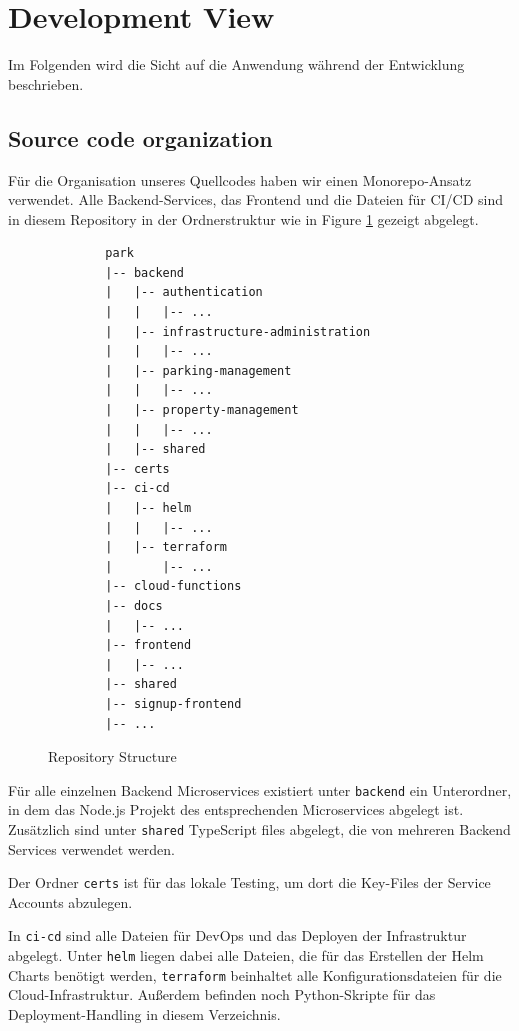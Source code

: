 \section{Development View}

Im Folgenden wird die Sicht auf die Anwendung während der Entwicklung beschrieben.

\subsection{Source code organization}
Für die Organisation unseres Quellcodes haben wir einen Monorepo-Ansatz verwendet. Alle Backend-Services, das Frontend und die Dateien für CI/CD sind in diesem Repository in der Ordnerstruktur wie in Figure \ref{fig:repo-structure} gezeigt abgelegt.

\begin{figure}[ht]
    \begin{verbatim}
        park
        |-- backend
        |   |-- authentication
        |   |   |-- ...
        |   |-- infrastructure-administration
        |   |   |-- ...
        |   |-- parking-management
        |   |   |-- ...
        |   |-- property-management
        |   |   |-- ...
        |   |-- shared
        |-- certs
        |-- ci-cd
        |   |-- helm
        |   |   |-- ...
        |   |-- terraform
        |       |-- ...
        |-- cloud-functions
        |-- docs
        |   |-- ...
        |-- frontend
        |   |-- ...
        |-- shared
        |-- signup-frontend
        |-- ...
    \end{verbatim}
    \caption{Repository Structure}
    \label{fig:repo-structure}
\end{figure}

Für alle einzelnen Backend Microservices existiert unter \verb|backend| ein Unterordner, in dem das Node.js Projekt des entsprechenden Microservices abgelegt ist. Zusätzlich sind unter \verb|shared| TypeScript files abgelegt, die von mehreren Backend Services verwendet werden.

Der Ordner \verb|certs| ist für das lokale Testing, um dort die Key-Files der Service Accounts abzulegen.

In \verb|ci-cd| sind alle Dateien für DevOps und das Deployen der Infrastruktur abgelegt. Unter \verb|helm| liegen dabei alle Dateien, die für das Erstellen der Helm Charts benötigt werden, \verb|terraform| beinhaltet alle Konfigurationsdateien für die Cloud-Infrastruktur. Außerdem befinden noch Python-Skripte für das Deployment-Handling in diesem Verzeichnis.


